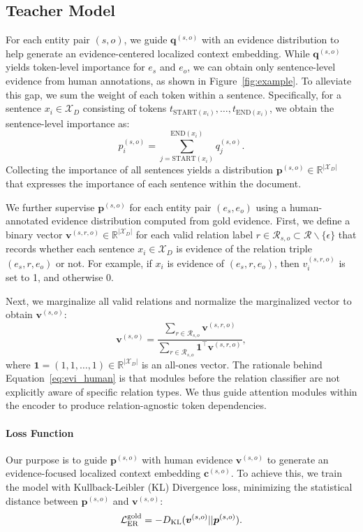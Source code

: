 \documentclass[11pt]{article}
\newcommand{\setR}{\mathcal{R}}
\newcommand{\setX}{\mathcal{X}}
\begin{document}
\subsection{Teacher Model}
\label{sec:teacher}
For each entity pair $(s,o)$, we guide $\bm{q}^{(s,o)}$ with an evidence distribution to help generate an evidence-centered localized context embedding.
While $\bm{q}^{(s,o)}$ yields token-level importance for $e_s$ and $e_o$, we can obtain only sentence-level evidence from human annotations, as shown in Figure~\ref{fig:example}.
To alleviate this gap, we sum the weight of each token within a sentence.
Specifically, for a sentence $x_i \in \setX_D$ consisting of tokens $t_{\textrm{START}(x_i)}, \dots, t_{\textrm{END}(x_i)}$, we obtain the sentence-level importance as:
\begin{equation}
    p_i^{(s,o)} = \sum_{j=\textrm{START}(x_i)}^{\textrm{END}(x_i)}q_j^{(s,o)}.
    \label{eq:sent_imp}
\end{equation}
Collecting the importance of all sentences yields a distribution $\bm{p}^{(s,o)} \in \mathbb{R}^{|\setX_D|}$ that expresses the importance of each sentence within the document. 

We further supervise $\bm{p}^{(s,o)}$ for each entity pair $(e_s, e_o)$ using a human-annotated evidence distribution computed from gold evidence.
First, we define a binary vector $\bm{v}^{(s,r,o)} \in \mathbb{R}^{|\setX_D|}$ for each valid relation label $r \in \setR_{s,o} \subset \setR \backslash \{\epsilon\}$ that records whether each sentence $x_i \in \setX_D$ is evidence of the relation triple $(e_s, r, e_o)$ or not.
For example, if $x_i$ is evidence of $(e_s, r, e_o)$, then $v^{(s,r,o)}_i$ is set to 1, and otherwise 0.

Next, we marginalize all valid relations and normalize the marginalized vector to obtain $\bm{v}^{(s,o)}$:
\begin{equation}
    \bm{v}^{(s,o)} = \frac{\sum_{r\in \setR_{s,o}}\bm{v}^{(s,r,o)}}{\sum_{r\in\setR_{s,o}}{\bm{1}^\top \bm{v}^{(s,r,o)}}},
    \label{eq:evi_human}
\end{equation}
where $\bm{1} = (1,1,\dots,1) \in \mathbb{R}^{|\setX_D|}$ is an all-ones vector.
The rationale behind Equation~\ref{eq:evi_human} is that modules before the relation classifier are not explicitly aware of specific relation types.
We thus guide attention modules within the encoder to produce relation-agnostic token dependencies.

\paragraph{Loss Function} Our purpose is to guide $\bm{p}^{(s,o)}$ with human evidence $\bm{v}^{(s,o)}$ to generate an evidence-focused localized context embedding $\bm{c}^{(s,o)}$.
To achieve this, we train the model with Kullback-Leibler (KL) Divergence loss, minimizing the statistical distance between $\bm{p}^{(s,o)}$ and $\bm{v}^{(s,o)}$:
\begin{equation}
    \mathcal{L}_{\mathrm{ER}}^{\rm gold} = -D_{\rm KL}( \bm{v}^{(s,o)} || \bm{p}^{(s,o)}).
    \label{eq:loss_evi}
\end{equation}
\end{document}
